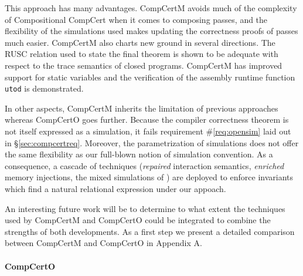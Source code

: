 \documentclass[sigplan,10pt,review]{acmart}
\begin{document}
This approach has many advantages.
CompCertM avoids much of the complexity
of Compositional CompCert
when it comes to composing passes,
and the flexibility of the simulations used
makes updating the correctness proofs of passes much easier.
CompCertM also charts new ground in several directions.
The RUSC relation used to state the final theorem
is shown to be adequate with respect to the trace semantics
of closed programs.
CompCertM has improved support for static variables
and the verification of
the assembly runtime function \texttt{utod} is demonstrated.

In other aspects, CompCertM inherits the limitation of previous
approaches whereas CompCertO goes further.  Because the compiler
correctness theorem is not itself expressed as a simulation, it fails
requirement \#\ref{req:opensim} laid out in \S\ref{sec:compcertreq}.
Moreover, the parametrization of simulations does not offer the same
flexibility as our full-blown notion of simulation convention.  As a
consequence, a cascade of techniques (\emph{repaired} interaction
semantics, \emph{enriched} memory injections, the mixed simulations of
\cite{pilsner}) are deployed to enforce invariants which find a
natural relational expression under our appoach.

An interesting future work will be to determine
to what extent the techniques used by CompCertM and CompCertO could be
integrated to combine the strengths of both developments.  As a first
step we present a detailed comparison between CompCertM and CompCertO
in Appendix A.


\paragraph{CompCertO}
\end{document}
